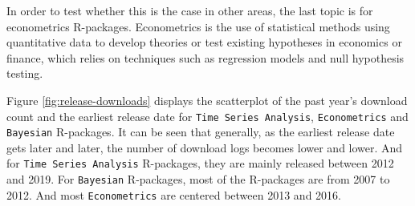 \documentclass[
]{book}
\begin{document}
In order to test whether this is the case in other areas, the last topic is for econometrics R-packages. Econometrics is the use of statistical methods using quantitative data to develop theories or test existing hypotheses in economics or finance, which relies on techniques such as regression models and null hypothesis testing\autocite{econometrics}.

Figure \ref{fig:release-downloads} displays the scatterplot of the past year's download count and the earliest release date for \texttt{Time\ Series\ Analysis}, \texttt{Econometrics} and \texttt{Bayesian} R-packages. It can be seen that generally, as the earliest release date gets later and later, the number of download logs becomes lower and lower. And for \texttt{Time\ Series\ Analysis} R-packages, they are mainly released between 2012 and 2019. For \texttt{Bayesian} R-packages, most of the R-packages are from 2007 to 2012. And most \texttt{Econometrics} are centered between 2013 and 2016.
\end{document}
